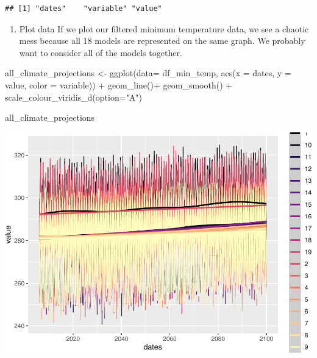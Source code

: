 \documentclass[
  paper=a4,
  ,captions=tableheading
]{scrartcl}
\newenvironment{Shaded}{\begin{snugshade}}{\end{snugshade}}
\newcommand{\AttributeTok}[1]{\textcolor[rgb]{0.77,0.63,0.00}{#1}}
\newcommand{\FunctionTok}[1]{\textcolor[rgb]{0.00,0.00,0.00}{#1}}
\newcommand{\NormalTok}[1]{#1}
\newcommand{\OtherTok}[1]{\textcolor[rgb]{0.56,0.35,0.01}{#1}}
\newcommand{\SpecialCharTok}[1]{\textcolor[rgb]{0.00,0.00,0.00}{#1}}
\newcommand{\StringTok}[1]{\textcolor[rgb]{0.31,0.60,0.02}{#1}}
\providecommand{\tightlist}{%
  \setlength{\itemsep}{0pt}\setlength{\parskip}{0pt}}
\begin{document}
\begin{verbatim}
## [1] "dates"    "variable" "value"
\end{verbatim}

\begin{enumerate}
\def\labelenumi{\arabic{enumi}.}
\setcounter{enumi}{1}
\tightlist
\item
  Plot data If we plot our filtered minimum temperature data, we see a
  chaotic mess because all 18 models are represented on the same graph.
  We probably want to consider all of the models together.
\end{enumerate}

\begin{Shaded}
\begin{Highlighting}[]
\NormalTok{all\_climate\_projections }\OtherTok{\textless{}{-}} \FunctionTok{ggplot}\NormalTok{(}\AttributeTok{data=}\NormalTok{ df\_min\_temp, }\FunctionTok{aes}\NormalTok{(}\AttributeTok{x =}\NormalTok{ dates, }\AttributeTok{y =}\NormalTok{ value, }\AttributeTok{color =}\NormalTok{ variable)) }\SpecialCharTok{+}
  \FunctionTok{geom\_line}\NormalTok{()}\SpecialCharTok{+}
  \FunctionTok{geom\_smooth}\NormalTok{() }\SpecialCharTok{+}
  \FunctionTok{scale\_colour\_viridis\_d}\NormalTok{(}\AttributeTok{option=}\StringTok{"A"}\NormalTok{)}

\NormalTok{all\_climate\_projections}
\end{Highlighting}
\end{Shaded}

\includegraphics{Haskell_files/figure-latex/unnamed-chunk-50-1.pdf}
\end{document}
